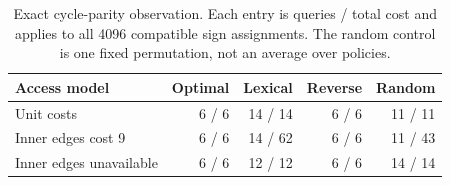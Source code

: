 \begin{table}[!htbp]\centering
\caption{Exact cycle-parity observation. Each entry is queries / total cost and applies to all 4096 compatible sign assignments. The random control is one fixed permutation, not an average over policies.}
\begin{tabular}{lrrrr}\toprule
Access model & Optimal & Lexical & Reverse & Random \\\midrule
Unit costs & 6 / 6 & 14 / 14 & 6 / 6 & 11 / 11 \\
Inner edges cost 9 & 6 / 6 & 14 / 62 & 6 / 6 & 11 / 43 \\
Inner edges unavailable & 6 / 6 & 12 / 12 & 6 / 6 & 14 / 14 \\
\bottomrule\end{tabular}\label{tab:orientationqueries}
\end{table}

